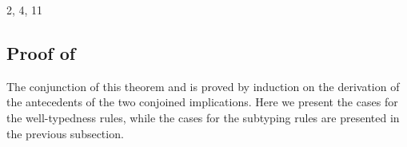 \begin{bycase}
\Case{\Rstteq}
\begin{derivation}
     {2, 4, 11}
\end{derivation}

\end{bycase}


\subsection*{Proof of }

The conjunction of this theorem and  is proved by
induction on the derivation of the antecedents of the two conjoined
implications. Here we present the cases for the well-typedness rules, while
the cases for the subtyping rules are presented in the previous subsection.


